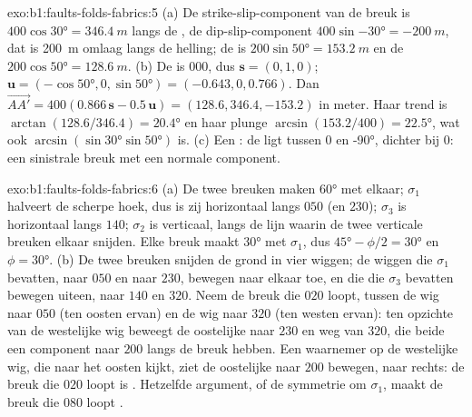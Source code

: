 \begin{solution}{exo:b1:faults-folds-fabrics:5}
(a) De strike-slip-component van de breuk is $400\cos\ang{30} = \qty{346.4}{m}$ langs de , de dip-slip-component $400\sin\ang{-30} = \qty{-200}{m}$, dat is
\qty{200}{m} omlaag langs de helling; de  is $200\sin\ang{50} = \qty{153.2}{m}$ en
de  $200\cos\ang{50} = \qty{128.6}{m}$. (b) De  is $000$, dus
$\mathbf s = (0, 1, 0)$; $\mathbf u = (-\cos\ang{50}, 0, \sin\ang{50}) =
(-0.643, 0, 0.766)$. Dan
$\overrightarrow{AA'} = 400(0.866\,\mathbf s - 0.5\,\mathbf u) =
(128.6, 346.4, -153.2)$ in meter. Haar trend is $\arctan(128.6/346.4) =
\ang{20.4}$ en haar plunge $\arcsin(153.2/400) = \ang{22.5}$, wat ook
$\arcsin(\sin\ang{30}\sin\ang{50})$ is. (c) Een : de  ligt
tussen $0$ en \ang{-90}, dichter bij $0$: een sinistrale breuk met een normale
component.
\end{solution}

\begin{solution}{exo:b1:faults-folds-fabrics:6}
(a) De twee breuken maken \ang{60} met elkaar; $\sigma_1$ halveert de scherpe hoek,
dus is zij horizontaal langs $050$ (en $230$); $\sigma_3$ is horizontaal
langs $140$; $\sigma_2$ is verticaal, langs de lijn waarin de twee verticale breuken
elkaar snijden. Elke breuk maakt \ang{30} met $\sigma_1$, dus $\ang{45} - \phi/2 =
\ang{30}$ en $\phi = \ang{30}$. (b) De twee breuken snijden de grond in vier
wiggen; de wiggen die $\sigma_1$ bevatten, naar $050$ en naar $230$, bewegen naar elkaar toe,
en die die $\sigma_3$ bevatten bewegen uiteen, naar $140$ en $320$. Neem de breuk die
$020$ loopt, tussen de wig naar $050$ (ten oosten ervan) en de wig naar $320$ (ten
westen ervan): ten opzichte van de westelijke wig beweegt de oostelijke naar $230$ en weg
van $320$, die beide een component naar $200$ langs de breuk hebben. Een waarnemer op de
westelijke wig, die naar het oosten kijkt, ziet de oostelijke naar $200$ bewegen, naar rechts:
de breuk die $020$ loopt is . Hetzelfde argument, of de symmetrie om
$\sigma_1$, maakt de breuk die $080$ loopt .
\end{solution}


